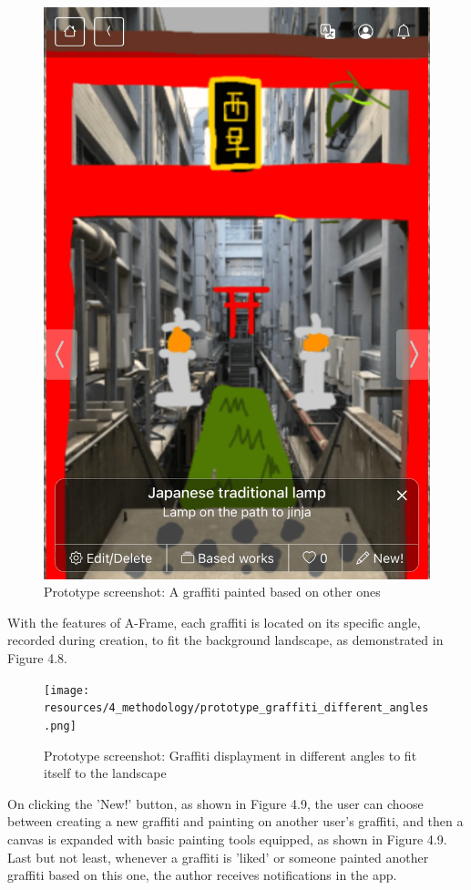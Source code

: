 \begin{figure}
\begin{minipage}{0.48\textwidth}
    \includegraphics[width=0.9\linewidth]{resources/4_methodology/prototype_based_graffiti.png}
      \caption{Prototype screenshot: A graffiti painted based on other ones}
  \end{minipage}
\end{figure}

With the features of A-Frame, each graffiti is located on its specific angle, recorded during creation, to fit the background landscape, as demonstrated in Figure 4.8.

\begin{figure}
  \centering
  \texttt{[image: resources/4\_methodology/prototype\_graffiti\_different\_angles.png]}
    \caption{Prototype screenshot: Graffiti displayment in different angles to fit itself to the landscape}
\end{figure}

On clicking the 'New!' button, as shown in Figure 4.9, the user can choose between creating a new graffiti and painting on another user's graffiti,
and then a canvas is expanded with basic painting tools equipped, as shown in Figure 4.9.
Last but not least, whenever a graffiti is 'liked' or someone painted another graffiti based on this one, the author receives notifications in the app.

